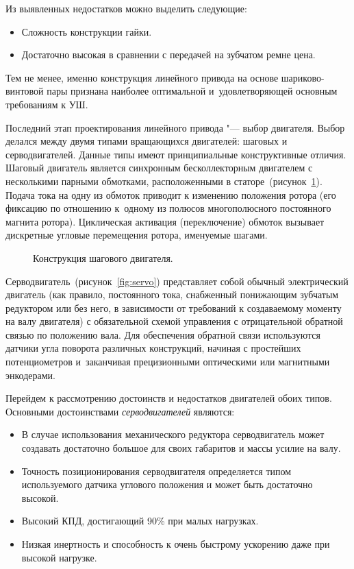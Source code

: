 Из выявленных недостатков можно выделить следующие:

\begin{itemize}
	\item Сложность конструкции гайки.
	\item Достаточно высокая в сравнении с передачей на зубчатом ремне цена.
\end{itemize}

Тем не менее, именно конструкция линейного привода на основе шариково-винтовой пары признана наиболее оптимальной и~удовлетворяющей основным требованиям к УШ. 

Последний этап проектирования линейного привода "--- выбор двигателя. Выбор делался между двумя типами вращающихся двигателей: шаговых и серводвигателей. Данные типы имеют принципиальные конструктивные отличия. Шаговый двигатель является синхронным бесколлекторным двигателем с несколькими парными обмотками, расположенными в статоре~(рисунок~\cref{fig:stepper}). Подача тока на одну из обмоток приводит к изменению положения ротора (его фиксацию по отношению к~одному из полюсов многополюсного постоянного магнита ротора). Циклическая активация (переключение) обмоток вызывает дискретные угловые перемещения ротора, именуемые шагами.

\begin{figure}[ht]
	\caption{Конструкция шагового двигателя.}\label{fig:stepper}
\end{figure}

Серводвигатель~(рисунок~\cref{fig:servo}) представляет собой обычный электрический двигатель (как правило, постоянного тока, снабженный понижающим зубчатым редуктором или без него, в зависимости от требований к создаваемому моменту на валу двигателя) с обязательной схемой управления с отрицательной обратной связью по положению вала. Для обеспечения обратной связи используются датчики угла поворота различных конструкций, начиная с простейших потенциометров и~заканчивая прецизионными оптическими или магнитными энкодерами.

Перейдем к рассмотрению достоинств и недостатков двигателей обоих типов. Основными достоинствами \textit{серводвигателей} являются:

\begin{itemize}
	\item В случае использования механического редуктора серводвигатель может создавать достаточно большое для своих габаритов и массы усилие на валу.
	\item Точность позиционирования серводвигателя определяется типом используемого датчика углового положения и может быть достаточно высокой.
	\item Высокий КПД, достигающий 90\% при малых нагрузках.
	\item Низкая инертность и способность к очень быстрому ускорению даже при высокой нагрузке.	
\end{itemize}

